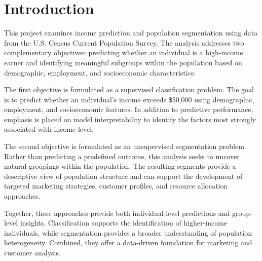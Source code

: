 
\section{Introduction}

This project examines income prediction and population segmentation using data from the U.S. Census Current Population Survey. The analysis addresses two complementary objectives: predicting whether an individual is a high-income earner and identifying meaningful subgroups within the population based on demographic, employment, and socioeconomic characteristics.

The first objective is formulated as a supervised classification problem. The goal is to predict whether an individual's income exceeds \$50,000 using demographic, employment, and socioeconomic features. In addition to predictive performance, emphasis is placed on model interpretability to identify the factors most strongly associated with income level.

The second objective is formulated as an unsupervised segmentation problem. Rather than predicting a predefined outcome, this analysis seeks to uncover natural groupings within the population. The resulting segments provide a descriptive view of population structure and can support the development of targeted marketing strategies, customer profiles, and resource allocation approaches.

Together, these approaches provide both individual-level predictions and group-level insights. Classification supports the identification of higher-income individuals, while segmentation provides a broader understanding of population heterogeneity. Combined, they offer a data-driven foundation for marketing and customer analysis.

